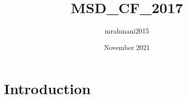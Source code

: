 \documentclass{article}
\title{MSD_CF_2017}
\author{mrahmani2015 }
\date{November 2021}
\begin{document}
\maketitle

\section{Introduction}
\end{document}
